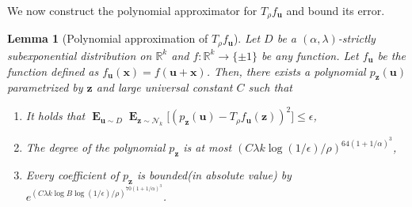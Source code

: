 \documentclass[10pt,a4paper]{article}
\newtheorem{lemma}{Lemma}[section]
\renewcommand\vec[1]{\mathbf{#1}}
\DeclareMathOperator*{\E}{\mathbf{E}}
\newcommand{\R}{\mathbb{R}}
\newcommand{\1}{\Ind}
\newcommand{\x}{\vec x}
\newcommand{\vu}{\vec u}
\newcommand{\z}{\vec z}
\newcommand{\Gauss}{\mathcal{N}}
\begin{document}
We now construct the polynomial approximator for $T_{\rho}f_{\vu}$ and bound its error.

\begin{lemma}[Polynomial approximation of $T_{\rho}f_{\vu}$]
    \label{lem:ou_approx_subexp}
    Let $D$ be a $(\alpha,\lambda)$-strictly subexponential distribution on $\R^k$ and $f:\R^{k}\to\{\pm 1\}$ be any function. Let $f_{\vu}$ be the function defined as $f_{\vu}(\x)=f(\vu+\x)$. Then, there exists a polynomial $p_{\z}(\vu)$ parametrized by $\z$ and large universal constant $C$ such that 
    \begin{enumerate}
        \item It holds that $\E_{\vu\sim D}\E_{\z\sim \Gauss_{k}}\bigl[(p_{\z}(\vu)-T_{\rho}f_{\vu}(\z))^2\bigr]\leq \epsilon$,
        \item The degree of the polynomial $p_{\z}$ is at most $\left(C\lambda k\log (1/\epsilon)/\rho\right)^{64(1+1/\alpha)^3}$,
        \item Every coefficient of $p_{\z}$ is bounded(in absolute value) by $e^{\left(C\lambda k\log B\log (1/\epsilon)/\rho\right)^{70(1+1/\alpha)^3}}$.
    \end{enumerate}
\end{lemma}
\end{document}
